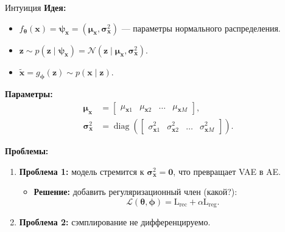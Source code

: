 \begin{frame}[allowframebreaks]{Интуиция}
    \textbf{Идея:}
    \begin{itemize}
        \item $f_{\boldsymbol{\theta}}(\boldsymbol{x}) = \boldsymbol{\psi}_{\boldsymbol{x}} = \left(\boldsymbol{\mu}_{\boldsymbol{x}}, \boldsymbol{\sigma}_{\boldsymbol{x}}^2\right)$ — параметры нормального распределения.
        \item $\boldsymbol{z} \sim p(\boldsymbol{z} \mid \boldsymbol{\psi}_{\boldsymbol{x}}) = \mathcal{N}(\boldsymbol{z} \mid \boldsymbol{\mu}_{\boldsymbol{x}}, \boldsymbol{\sigma}_{\boldsymbol{x}}^2)$.
        \item $\tilde{\boldsymbol{x}} = g_{\boldsymbol{\phi}}(\boldsymbol{z}) \sim p(\boldsymbol{x} \mid \boldsymbol{z})$.
    \end{itemize}

    \textbf{Параметры:}
    \begin{align*}
        \boldsymbol{\mu}_{\boldsymbol{x}}      & = \begin{bmatrix} \mu_{\boldsymbol{x}1} & \mu_{\boldsymbol{x}2} & \ldots & \mu_{\boldsymbol{x}M} \end{bmatrix},                                                \\
        \boldsymbol{\sigma}_{\boldsymbol{x}}^2 & = \operatorname{diag}\left(\begin{bmatrix} \sigma_{\boldsymbol{x}1}^2 & \sigma_{\boldsymbol{x}2}^2 & \ldots & \sigma_{\boldsymbol{x}M}^2 \end{bmatrix}\right).
    \end{align*}

    \framebreak

    \textbf{Проблемы:}
    \begin{enumerate}
        \item \textbf{Проблема 1:} модель стремится к $\boldsymbol{\sigma}_{\boldsymbol{x}}^2 = \mathbf{0}$, что превращает VAE в AE.
              \begin{itemize}
                  \item \textbf{Решение:} добавить регуляризационный член (какой?):
                        \begin{equation*}
                            \mathcal{L}(\boldsymbol{\theta}, \boldsymbol{\phi}) = \text{L}_{\text{rec}} + \alpha \text{L}_{\text{reg}}.
                        \end{equation*}
              \end{itemize}
        \item \textbf{Проблема 2:} сэмплирование не дифференцируемо.
    \end{enumerate}
\end{frame}

